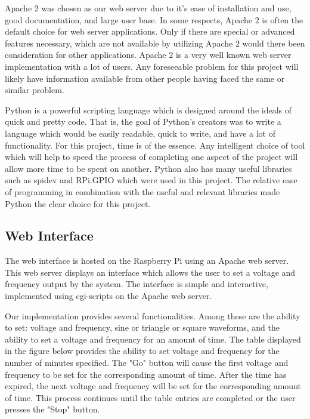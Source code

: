 \documentclass{article}	%
\begin{document}
\begin{multicols}{2}
Apache 2 was chosen as our web server due
to it's ease of installation and use,
good documentation, and
large user base.
In some respects,
Apache 2 is often the default choice for web server applications.
Only if there are special or advanced features necessary,
which are not available by utilizing Apache 2 would there
been consideration for other applications.
Apache 2 is a very well known web server implementation with a lot of users.
Any foreseeable problem for this project will likely have
information available from other people having faced the same or similar problem.

Python is a powerful scripting language which
is designed around the ideals of quick and pretty code.
That is, 
the goal of Python's creators was to write a language
which would be easily readable, quick to write, and
have a lot of functionality.
For this project,
time is of the essence.
Any intelligent choice of tool which will help to speed the process of 
completing one aspect of the project will allow more time to be spent on another.
Python also has many useful libraries such as spidev and RPi.GPIO
which were used in this project.
The relative ease of programming in combination with the useful and
relevant libraries made Python the clear choice for this project.

\subsection{Web Interface}
The web interface is hosted on the Raspberry Pi using an Apache web server.
This web server displays an interface which allows the user to
set a voltage and frequency output by the system. 
The interface is simple and interactive,
implemented using cgi-scripts on the Apache web server.

Our implementation provides several functionalities.
Among these are
the ability to set:
voltage and frequency,
sine or triangle or square waveforms,
and the ability to set a voltage and frequency for an amount of time.
The table displayed
in the figure below
provides the ability to set voltage and frequency for the number
of minutes specified.
The "Go" button will cause the first
voltage and frequency to be set for the corresponding amount of time.
After the time has expired,
the next voltage and frequency will be set for the corresponding amount of time.
This process continues until the table entries are completed or
the user presses the "Stop" button.


\end{multicols}
\end{document}
